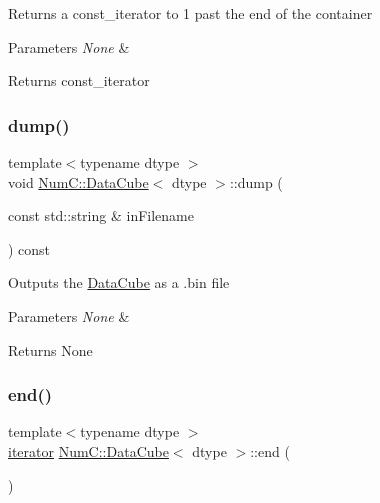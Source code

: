 Returns a const\+\_\+iterator to 1 past the end of the container


\begin{DoxyParams}{Parameters}
{\em None} & \\
\hline
\end{DoxyParams}
\begin{DoxyReturn}{Returns}
const\+\_\+iterator 
\end{DoxyReturn}
\mbox{\label{class_num_c_1_1_data_cube_ae6c210bb661ece34470af77068862f36}} 
\subsubsection{\texorpdfstring{dump()}{dump()}}
{\footnotesize\ttfamily template$<$typename dtype $>$ \\
void \mbox{\hyperlink{class_num_c_1_1_data_cube}{Num\+C\+::\+Data\+Cube}}$<$ dtype $>$\+::dump (\begin{DoxyParamCaption}\item[{const std\+::string \&}]{in\+Filename }\end{DoxyParamCaption}) const\hspace{0.3cm}{\ttfamily [inline]}}

Outputs the \mbox{\hyperlink{class_num_c_1_1_data_cube}{Data\+Cube}} as a .bin file


\begin{DoxyParams}{Parameters}
{\em None} & \\
\hline
\end{DoxyParams}
\begin{DoxyReturn}{Returns}
None 
\end{DoxyReturn}
\mbox{\label{class_num_c_1_1_data_cube_ac80a462829f04d482f44cb38678f9cce}} 
\subsubsection{\texorpdfstring{end()}{end()}}
{\footnotesize\ttfamily template$<$typename dtype $>$ \\
\mbox{\hyperlink{class_num_c_1_1_data_cube_aa3703e7574db61a4e1ef4b8db93db86a}{iterator}} \mbox{\hyperlink{class_num_c_1_1_data_cube}{Num\+C\+::\+Data\+Cube}}$<$ dtype $>$\+::end (\begin{DoxyParamCaption}{ }\end{DoxyParamCaption})\hspace{0.3cm}{\ttfamily [inline]}}

